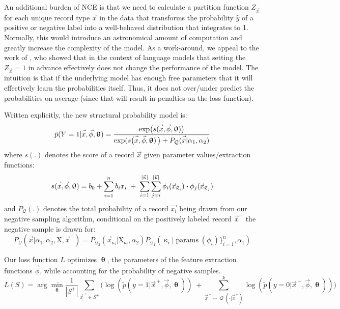 \documentclass{article}
\newcommand{\vect}[1]{\vec{#1}}
\DeclareMathOperator{\q}{{\mathcal{Q}}}
\newcommand{\dotp}{\boldsymbol{\cdot} }
\begin{document}
An additional burden of NCE is that we need to calculate a partition function $Z_{\vec{x}}$ for each unique record type $\vec{x}$ in the data that transforms the probability $\hat y$ of a positive or negative label into a well-behaved distribution that integrates to 1.
Normally, this would introduce an astronomical amount of computation and greatly increase the complexity of the model.
As a work-around, we appeal to the work of \citet{fastnnlang},
who showed that in the context of language models that setting the $Z_{\vec{x}}=1$ in advance effectively does not change the performance of the model.
The intuition is that if the underlying model has enough free parameters that it will effectively learn the probabilities itself.
Thus, it does not over/under predict the probabilities on average (since that will result in penalties on the loss function).

Written explicitly, the new structural probability model is:
\begin{equation}
\tilde p(Y=1|\vec{x\vphantom{phi}},\vec{\phi}, \bm\uptheta) = \frac{\exp\bigl(s(\vec{x\vphantom{phi}},\vec{\phi}, \bm\uptheta) \bigr)}{\exp( s\bigl(\vec{x\vphantom{phi}},\vec{\phi}, \bm\uptheta) \, \bigr) + P_{\q}(\vec{\vphantom{phi}x}| \alpha_1,\alpha_2)}
\end{equation}
where $s(.)$ denotes the score of a record $\vec{x}$ given parameter values/extraction functions:
\begin{equation}
s(\vec{x\vphantom{phi}},\vec{\phi}, \bm\uptheta) =
  b_0 +
                      \sum_{i=1 \vphantom{G(i)}}^n b_i x_i  \; + \;
                       \sum_{i =1}^{|\vect{\upkappa}|} \sum_{j=i}^{|\vect{\upkappa}|}   \phi_i( \vect{x}_{\vect{\upkappa}_i}) \dotp \phi_j( \vect{x}_{\vect{\upkappa}_j})
\end{equation}
and $P_{\q}(.)$ denotes the total probability of a record $\vec{x_i}$ being drawn from our negative sampling algorithm, conditional on the positively labeled record $\vect{x}^+$ the negative sample is drawn for:
\begin{equation}
P_{\q}(\vec{x}|\alpha_1,\alpha_2,\mathrm{X},\vect{x}^+) = P_{\q_2}(\vec{x}_{\upkappa_i}|\mathrm{X}_{\upkappa_i},\alpha_2) P_{\q_1}(\upkappa_i|\operatorname{params}(\phi_i)\}_{i=1}^n,\alpha_1)
\end{equation}

Our loss function $L$ optimizes $\bm\uptheta$, the parameters of the feature extraction functions $\vect\phi$, while accounting for the probability of negative samples.
\begin{equation}
L(S)  = \arg\min_{\bm\uptheta}   \frac{1}{|S^+|} \sum_{\vect{x}^{\,+} \in S^+} \Big(\log(\tilde p(y=1|\vect{x}^{\,+},\vec{\phi},\bm\uptheta   ) ) \; + \sum_{\vect{x}^{\,-}  \sim \q(\cdot|\vect{x}^+)}^k \log(\tilde p(y=0|\vect{x}^{\,-},\vec{\phi},\bm\uptheta   )) \Big)
\end{equation}
\end{document}
